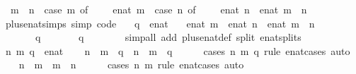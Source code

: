 \begin{isabellebody}
\ \ {\isachardoublequoteopen}m\ {\isacharplus}\ n\ {\isacharequal}\ {\isacharparenleft}case\ m\ of\ {\isasyminfinity}\ {\isasymRightarrow}\ {\isasyminfinity}\ {\isacharbar}\ enat\ m\ {\isasymRightarrow}\ {\isacharparenleft}case\ n\ of\ {\isasyminfinity}\ {\isasymRightarrow}\ {\isasyminfinity}\ {\isacharbar}\ enat\ n\ {\isasymRightarrow}\ enat\ {\isacharparenleft}m\ {\isacharplus}\ n{\isacharparenright}{\isacharparenright}{\isacharparenright}{\isachardoublequoteclose}\isanewline
\isanewline
{}\isamarkupfalse%
\ plus{\isacharunderscore}enat{\isacharunderscore}simps\ {\isacharbrackleft}simp{\isacharcomma}\ code{\isacharbrackright}{\isacharcolon}\isanewline
\ \ \ q\ {\isacharcolon}{\isacharcolon}\ enat\isanewline
\ \ \ {\isachardoublequoteopen}enat\ m\ {\isacharplus}\ enat\ n\ {\isacharequal}\ enat\ {\isacharparenleft}m\ {\isacharplus}\ n{\isacharparenright}{\isachardoublequoteclose}\isanewline
\ \ \ \ \ {\isachardoublequoteopen}{\isasyminfinity}\ {\isacharplus}\ q\ {\isacharequal}\ {\isasyminfinity}{\isachardoublequoteclose}\isanewline
\ \ \ \ \ {\isachardoublequoteopen}q\ {\isacharplus}\ {\isasyminfinity}\ {\isacharequal}\ {\isasyminfinity}{\isachardoublequoteclose}\isanewline
%
\isadelimproof
\ \ %
\endisadelimproof
%
\isatagproof
{}\isamarkupfalse%
\ {\isacharparenleft}simp{\isacharunderscore}all\ add{\isacharcolon}\ plus{\isacharunderscore}enat{\isacharunderscore}def\ split{\isacharcolon}\ enat{\isachardot}splits{\isacharparenright}%
\endisatagproof
{\isafoldproof}%
%
\isadelimproof
\isanewline
%
\endisadelimproof
\isanewline
{}\isamarkupfalse%
\isanewline
%
\isadelimproof
%
\endisadelimproof
%
\isatagproof
{}\isamarkupfalse%
\isanewline
\ \ \isamarkupfalse%
\ n\ m\ q\ {\isacharcolon}{\isacharcolon}\ enat\isanewline
\ \ \isamarkupfalse%
\ {\isachardoublequoteopen}n\ {\isacharplus}\ m\ {\isacharplus}\ q\ {\isacharequal}\ n\ {\isacharplus}\ {\isacharparenleft}m\ {\isacharplus}\ q{\isacharparenright}{\isachardoublequoteclose}\isanewline
\ \ \ \ \isamarkupfalse%
\ {\isacharparenleft}cases\ n\ m\ q\ rule{\isacharcolon}\ enat{}{\isacharunderscore}cases{\isacharparenright}\ auto\isanewline
\ \ \isamarkupfalse%
\ {\isachardoublequoteopen}n\ {\isacharplus}\ m\ {\isacharequal}\ m\ {\isacharplus}\ n{\isachardoublequoteclose}\isanewline
\ \ \ \ \isamarkupfalse%
\ {\isacharparenleft}cases\ n\ m\ rule{\isacharcolon}\ enat{}{\isacharunderscore}cases{\isacharparenright}\ auto\isanewline

\end{isabellebody}
